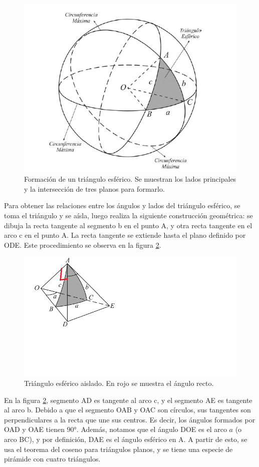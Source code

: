 \begin{figure}[ht]
	\centering
	\includegraphics[scale=0.5]{triang_esfer_5_el}
	\caption{Formación de un triángulo esférico. Se muestran los lados principales y la intersección de tres planos para formarlo.}
	\label{fig:form_triang_esfer}
\end{figure}
\vspace{-5mm}
Para obtener las relaciones entre los ángulos y lados del triángulo esférico, se toma el triángulo y se aísla, luego realiza la siguiente construcción geométrica: se dibuja la recta tangente al segmento b en el punto A, y otra recta tangente en el arco c en el punto A. La recta tangente se extiende hasta el plano definido por ODE. Este procedimiento se observa en la figura \ref{fig:triang_aisl}. 
\begin{figure}[ht!]
	\centering
	\includegraphics[trim={0 5cm 8cm 0},clip=true]{triang_esfer_aisl} 
	\caption{Triángulo esférico aislado. En rojo se muestra el ángulo recto.}
	\label{fig:triang_aisl}
\end{figure}
En la figura \ref{fig:triang_aisl}, segmento AD es tangente al arco c, y el segmento AE es tangente al arco b. Debido a que el segmento OAB y OAC son círculos, sus tangentes son perpendiculares a la recta que une sus centros. Es decir, los ángulos formados por OAD y OAE tienen 90°. Además, notamos que el ángulo DOE es el arco $a$ (o arco BC), y por definición, DAE es el ángulo esférico en A. A partir de esto, se usa el teorema del coseno para triángulos planos, y se tiene una especie de pirámide con cuatro triángulos. 


